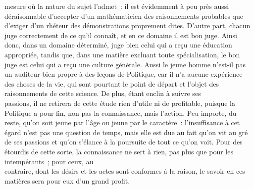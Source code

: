 \documentclass[french,twoside]{book} %
\begin{document}
mesure où la nature du sujet l’admet : il est évidemment à peu près aussi déraisonnable d’accepter d’un mathématicien des raisonnements probables que d’exiger d’un rhéteur des démonstrations proprement dites. D’autre part, chacun juge correctement de ce qu’il connaît, et en ce domaine il est bon juge. Ainsi donc, dans un domaine  déterminé, juge bien celui qui a reçu une éducation appropriée, tandis que, dans une matière excluant toute spécialisation, le bon juge est celui qui a reçu une culture générale. Aussi le jeune homme n’est-il pas un auditeur bien propre à des leçons de Politique, car il n’a aucune expérience des choses de la vie, qui sont pourtant le point de départ et l’objet des raisonnements de cette science. De plus, étant enclin à suivre ses \\
passions, il ne retirera de cette étude rien d’utile ni de profitable, puisque la Politique a pour fin, non pas la connaissance, mais l’action. Peu importe, du reste, qu’on soit jeune par l’âge ou jeune par le caractère : l’insuffisance à cet égard n’est pas une question de temps, mais elle est due au fait qu’on vit au gré de ses passions et qu’on s’élance à la poursuite de tout ce qu’on voit. Pour des étourdis de cette sorte, la connaissance ne sert à rien, pas plus que pour les intempérants ; pour ceux, au \\
contraire, dont les désirs et les actes sont conformes à la raison, le savoir en ces matières sera pour eux d’un grand profit.
\end{document}
